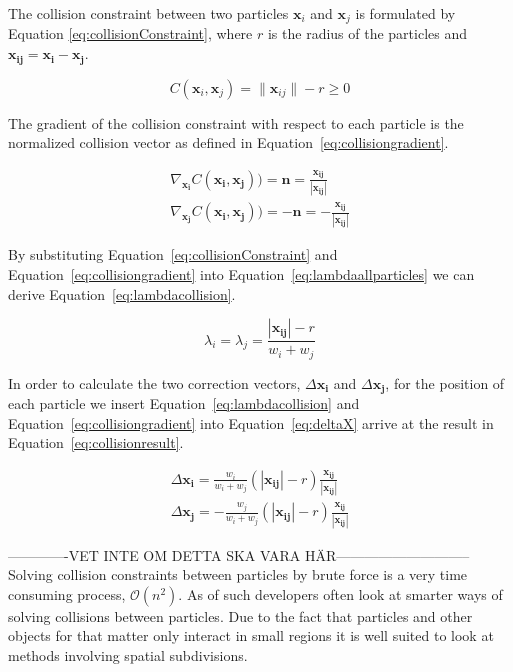 The collision constraint between two particles $ \mathbf{x}_{i} $ and $
\mathbf{x}_{j} $ is formulated by Equation \ref{eq:collisionConstraint}, where
$ r $ is the radius of the particles and $ \mathbf{x_{ij}} = \mathbf{x_{i}} - \mathbf{x_{j}} $.

\begin{equation} \label{eq:collisionConstraint}
  C(\mathbf{x}_{i}, \mathbf{x}_{j}) = \| \mathbf{x}_{ij} \| - r \geq 0
\end{equation}

The gradient of the collision constraint with respect to each particle is the
normalized collision vector as defined in Equation~\ref{eq:collisiongradient}.

\begin{equation}
\label{eq:collisiongradient}
\begin{aligned}
\nabla_{\mathbf{x_{i}}} C(\mathbf{x_{i}}, \mathbf{x_{j}})) = \mathbf{n} = \frac{\mathbf{x_{ij}}}{\left | \mathbf{x_{ij}} \right |}
\\
\nabla_{\mathbf{x_{j}}} C(\mathbf{x_{i}}, \mathbf{x_{j}})) = - \mathbf{n} = - \frac{\mathbf{x_{ij}}}{\left | \mathbf{x_{ij}} \right |}
\end{aligned}
\end{equation}

By substituting Equation~\ref{eq:collisionConstraint} and
Equation~\ref{eq:collisiongradient} into Equation~\ref{eq:lambdaallparticles} we
can derive Equation~\ref{eq:lambdacollision}.

\begin{equation}
\label{eq:lambdacollision}
\lambda_{i} = \lambda_{j} = \frac{\left | \mathbf{x_{ij}} \right | - r}{w_{i} + w_{j}}
\end{equation}

In order to calculate the two correction vectors, $ \Delta \mathbf{x_{i}} $ and
$ \Delta \mathbf{x_{j}} $, for the position of each particle we insert
Equation~\ref{eq:lambdacollision} and Equation~\ref{eq:collisiongradient} into
Equation~\ref{eq:deltaX} arrive at the result in Equation~\ref{eq:collisionresult}.

\begin{equation}
\label{eq:collisionresult}
\begin{aligned}
\Delta \mathbf{x_{i}} = \frac{w_{i}}{w_{i} + w_{j}}(\left | \mathbf{x_{ij}} \right | - r) \frac{\mathbf{x_{ij}}}{\left | \mathbf{x_{ij}} \right |}
\\
\Delta \mathbf{x_{j}} = -\frac{w_{j}}{w_{i} + w_{j}}(\left | \mathbf{x_{ij}} \right | - r) \frac{\mathbf{x_{ij}}}{\left | \mathbf{x_{ij}} \right |}
\end{aligned}
\end{equation}

-------------VET INTE OM DETTA SKA VARA HÄR-----------------------------
Solving collision constraints between particles by brute force is a very time
consuming process, $\mathcal{O}(n^{2})$. As of such developers often look at
smarter ways of solving collisions between particles. Due to the fact that
particles and other objects for that matter only interact in small regions it
is well suited to look at methods involving spatial subdivisions.


